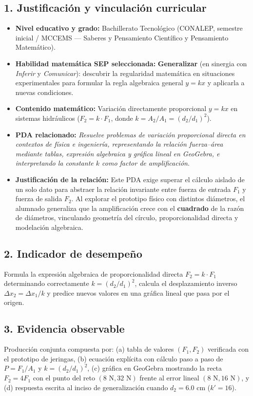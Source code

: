 \documentclass[spanish,letterpaper,oneside]{article}
\begin{document}
\begin{propuestabox}[title={Propuesta Didáctica Escrita · Generalizar en Sistemas Hidráulicos}]
\subsection*{1. Justificación y vinculación curricular}
\begin{itemize}
  \item \textbf{Nivel educativo y grado:} Bachillerato Tecnológico (CONALEP, semestre inicial / MCCEMS — Saberes y Pensamiento Científico y Pensamiento Matemático).
  \item \textbf{Habilidad matemática SEP seleccionada:} \textbf{Generalizar} (en sinergia con \textit{Inferir} y \textit{Comunicar}): descubrir la regularidad matemática en situaciones experimentales para formular la regla algebraica general $y = k x$ y aplicarla a nuevas condiciones.
  \item \textbf{Contenido matemático:} Variación directamente proporcional $y = k x$ en sistemas hidráulicos ($F_2 = k\cdot F_1$, donde $k = A_2/A_1 = (d_2/d_1)^2$).
  \item \textbf{PDA relacionado:} \textit{Resuelve problemas de variación proporcional directa en contextos de física e ingeniería, representando la relación fuerza--área mediante tablas, expresión algebraica y gráfica lineal en GeoGebra, e interpretando la constante $k$ como factor de amplificación}.
  \item \textbf{Justificación de la relación:} Este PDA exige superar el cálculo aislado de un solo dato para abstraer la relación invariante entre fuerza de entrada $F_1$ y fuerza de salida $F_2$. Al explorar el prototipo físico con distintos diámetros, el alumnado generaliza que la amplificación crece con el \textbf{cuadrado} de la razón de diámetros, vinculando geometría del círculo, proporcionalidad directa y modelación algebraica.
\end{itemize}

\subsection*{2. Indicador de desempeño}
Formula la expresión algebraica de proporcionalidad directa $F_2 = k\cdot F_1$ determinando correctamente $k = (d_2/d_1)^2$, calcula el desplazamiento inverso $\Delta x_2 = \Delta x_1 / k$ y predice nuevos valores en una gráfica lineal que pasa por el origen.

\subsection*{3. Evidencia observable}
Producción conjunta compuesta por: (a) tabla de valores $(F_1, F_2)$ verificada con el prototipo de jeringas, (b) ecuación explícita con cálculo paso a paso de $P = F_1/A_1$ y $k = (d_2/d_1)^2$, (c) gráfica en GeoGebra mostrando la recta $F_2 = 4 F_1$ con el punto del reto $(8\text{ N}, 32\text{ N})$ frente al error lineal $(8\text{ N}, 16\text{ N})$, y (d) respuesta escrita al inciso de generalización cuando $d_2 = 6.0\text{ cm}$ ($k' = 16$).


\end{propuestabox}
\end{document}
